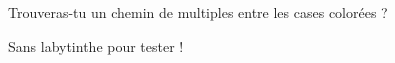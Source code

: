 \numeroteEnigme
\begin{enigme}
    Trouveras-tu un chemin de multiples entre les cases colorées ?

    Sans labytinthe pour tester !
\end{enigme}

